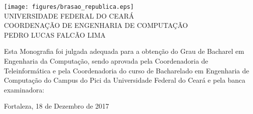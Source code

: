 \begin{folhadeaprovacao}
\setlength{\ABNTsignthickness}{0.2pt}
\setlength{\ABNTsignskip}{1.7cm}

\begin{center}
\texttt{[image: figures/brasao\_republica.eps]}\\

            {UNIVERSIDADE FEDERAL DO CEARÁ} \\
            {COORDENAÇÃO DE ENGENHARIA DE COMPUTAÇÃO}  \\

    \vspace{1.5cm}
                                    {PEDRO LUCAS FALCÃO LIMA}\\
    \bfseries{}
\end{center}

Esta Monografia foi julgada adequada para a obten\c{c}\~{a}o do Grau de Bacharel em Engenharia da Computação, sendo aprovada pela Coordenadoria de Teleinformática e pela Coordenadoria do curso de Bacharelado em Engenharia de Computação do Campus do Pici da Universidade Federal do Ceará e pela banca examinadora:

    \vspace{0.15cm}
   
    \vspace{0.15cm}%

    \begin{center}
        Fortaleza, 18 de Dezembro de 2017
    \end{center}
\end{folhadeaprovacao}